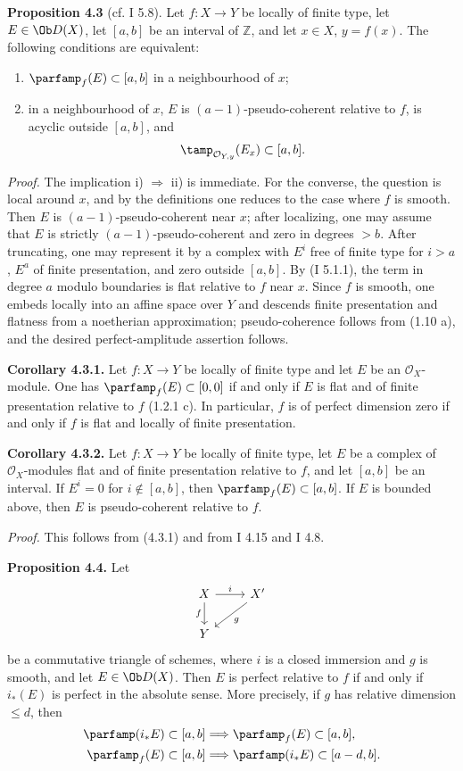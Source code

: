 \documentclass[11pt]{article}
\begin{document}
\textbf{Proposition 4.3} (cf. I 5.8). Let \(f:X\to Y\) be locally of finite type, let \(E\in\Ob D(X)\), let \([a,b]\) be an interval of \(\mathbb Z\), and let \(x\in X\), \(y=f(x)\). The following conditions are equivalent:
\begin{enumerate}[label=\roman*)]
\item \(\parfamp_f(E)\subset[a,b]\) in a neighbourhood of \(x\);
\item in a neighbourhood of \(x\), \(E\) is \((a-1)\)-pseudo-coherent relative to \(f\), is acyclic outside \([a,b]\), and
\[
 \tamp_{\mathcal O_{Y,y}}(E_x)\subset[a,b].
\]
\end{enumerate}

\emph{Proof.} The implication i) \(\Rightarrow\) ii) is immediate. For the converse, the question is local around \(x\), and by the definitions one reduces to the case where \(f\) is smooth. Then \(E\) is \((a-1)\)-pseudo-coherent near \(x\); after localizing, one may assume that \(E\) is strictly \((a-1)\)-pseudo-coherent and zero in degrees \(>b\). After truncating, one may represent it by a complex with \(E^i\) free of finite type for \(i>a\), \(E^a\) of finite presentation, and zero outside \([a,b]\). By (I 5.1.1), the term in degree \(a\) modulo boundaries is flat relative to \(f\) near \(x\). Since \(f\) is smooth, one embeds locally into an affine space over \(Y\) and descends finite presentation and flatness from a noetherian approximation; pseudo-coherence follows from (1.10 a), and the desired perfect-amplitude assertion follows.

\textbf{Corollary 4.3.1.} Let \(f:X\to Y\) be locally of finite type and let \(E\) be an \(\mathcal O_X\)-module. One has \(\parfamp_f(E)\subset[0,0]\) if and only if \(E\) is flat and of finite presentation relative to \(f\) (1.2.1 c). In particular, \(f\) is of perfect dimension zero if and only if \(f\) is flat and locally of finite presentation.

\textbf{Corollary 4.3.2.} Let \(f:X\to Y\) be locally of finite type, let \(E\) be a complex of \(\mathcal O_X\)-modules flat and of finite presentation relative to \(f\), and let \([a,b]\) be an interval. If \(E^i=0\) for \(i\notin[a,b]\), then \(\parfamp_f(E)\subset[a,b]\). If \(E\) is bounded above, then \(E\) is pseudo-coherent relative to \(f\).

\emph{Proof.} This follows from (4.3.1) and from I 4.15 and I 4.8.

\textbf{Proposition 4.4.} Let
\[
\begin{tikzcd}
X \arrow[r,"i"] \arrow[d,"f"'] & X' \arrow[dl,"g"]\\
Y &
\end{tikzcd}
\]
be a commutative triangle of schemes, where \(i\) is a closed immersion and \(g\) is smooth, and let \(E\in\Ob D(X)\). Then \(E\) is perfect relative to \(f\) if and only if \(i_*(E)\) is perfect in the absolute sense. More precisely, if \(g\) has relative dimension \(\leq d\), then
\begin{align*}
\parfamp(i_*E)
  \subset[a,b]&\Longrightarrow \parfamp_f(E)
  \subset[a,b],\\
\parfamp_f(E)
  \subset[a,b]&\Longrightarrow \parfamp(i_*E)
  \subset[a-d,b].
\end{align*}
\end{document}

